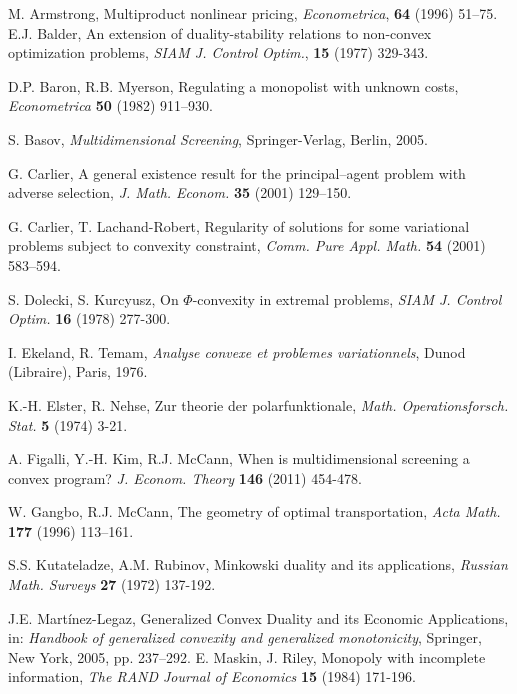 \documentclass[a4paper, 11pt]{amsart}
\numberwithin{equation}{section}
\theoremstyle{plain}
\theoremstyle{definition}
\theoremstyle{remark}
\begin{document}
\begin{thebibliography}{BCDE}
	
{	 
	M. Armstrong, 
	Multiproduct nonlinear pricing, 
	{\em Econometrica}, {\bf 64 }(1996) 51–75.
}	
		E.J. Balder, 
		An extension of duality-stability relations to non-convex optimization problems, 
		{\em SIAM J. Control Optim.}, {\bf 15} (1977) 329-343.
	
	D.P. Baron, R.B. Myerson, 
	Regulating a monopolist with unknown costs, 
	{\em Econometrica} {\bf 50} (1982) 911–930.
	
	S. Basov, 
	{\em Multidimensional Screening}, 
	Springer-Verlag, Berlin, 2005.
	
	G. Carlier, 
	A general existence result for the principal–agent problem with adverse selection, 
	{\em J. Math. Econom.} {\bf 35} (2001) 129–150.
	
	G. Carlier, T. Lachand-Robert, 
	Regularity of solutions for some variational problems subject to convexity constraint, 
	{\em Comm. Pure Appl. Math.} {\bf 54} (2001) 583–594.
	
{	 
	S. Dolecki, S. Kurcyusz, 
	On $\Phi$-convexity in extremal problems, 
	{\em SIAM J. Control Optim.} {\bf 16} (1978)  277-300.
}

	I. Ekeland, R. Temam,
	 {\em Analyse convexe et probl$\acute{e}$mes variationnels},
	 Dunod (Libraire), Paris, 1976.

{
	K.-H. Elster, R. Nehse, 
	Zur theorie der polarfunktionale, 
	{\em Math. Operationsforsch. Stat.} {\bf 5} (1974) 3-21.
}

	A. Figalli, Y.-H. Kim, R.J. McCann, 
	When is multidimensional screening a convex program? 
	{\em J. Econom. Theory} {\bf 146} (2011) 454-478.
	
{	 
	W. Gangbo, R.J. McCann, 
	The geometry of optimal transportation, 
	{\em Acta Math.} {\bf 177} (1996) 113–161.
}
	

{
	S.S. Kutateladze, A.M. Rubinov, 
	Minkowski duality and its applications, 
	{\em Russian Math. Surveys} {\bf 27}  (1972) 137-192.
}

	
{ 
	J.E. Martínez-Legaz, 
	Generalized Convex Duality and its Economic Applications, in: 
	{\em Handbook of generalized convexity and generalized monotonicity}, Springer, New York, 2005, pp. 237--292.	
}
{
	E. Maskin, J. Riley, 
	Monopoly with incomplete information, 
	{\em The RAND Journal of Economics} {\bf 15} (1984) 171-196.
}	
	


\end{thebibliography}
\end{document}
